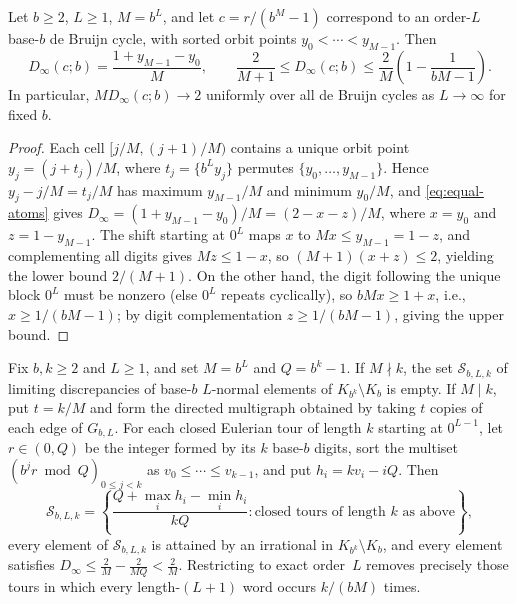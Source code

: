 \documentclass[11pt]{article}
\newcommand{\fr}[1]{\{#1\}}
\begin{document}
\begin{proposition}\label{prop:deBruijn-envelope}
Let $b\ge2$, $L\ge1$, $M=b^L$, and let $c=r/(b^M-1)$ correspond to an order-$L$ base-$b$ de Bruijn cycle, with sorted orbit points $y_0<\cdots<y_{M-1}$. Then
\begin{equation}\label{eq:deBruijn-envelope}
D_\infty(c;b)=\frac{1+y_{M-1}-y_0}{M},\qquad
\frac2{M+1}\le D_\infty(c;b)\le\frac2M\left(1-\frac1{bM-1}\right).
\end{equation}
In particular, $M D_\infty(c;b)\to2$ uniformly over all de Bruijn cycles as $L\to\infty$ for fixed $b$.
\end{proposition}

\begin{proof}
Each cell $[j/M,(j+1)/M)$ contains a unique orbit point $y_j=(j+t_j)/M$, where $t_j=\fr{b^L y_j}$ permutes $\{y_0,\dots,y_{M-1}\}$. Hence $y_j-j/M=t_j/M$ has maximum $y_{M-1}/M$ and minimum $y_0/M$, and \eqref{eq:equal-atoms} gives $D_\infty=(1+y_{M-1}-y_0)/M=(2-x-z)/M$, where $x=y_0$ and $z=1-y_{M-1}$. The shift starting at $0^L$ maps $x$ to $Mx\le y_{M-1}=1-z$, and complementing all digits gives $Mz\le 1-x$, so $(M+1)(x+z)\le2$, yielding the lower bound $2/(M+1)$. On the other hand, the digit following the unique block $0^L$ must be nonzero (else $0^L$ repeats cyclically), so $bMx\ge 1+x$, i.e., $x\ge 1/(bM-1)$; by digit complementation $z\ge 1/(bM-1)$, giving the upper bound.
\end{proof}

\begin{proposition}\label{prop:finite-spectrum}
Fix $b,k\ge2$ and $L\ge1$, and set $M=b^L$ and $Q=b^k-1$. If $M\nmid k$, the set $\mathcal S_{b,L,k}$ of limiting discrepancies of base-$b$ $L$-normal elements of $K_{b^k}\setminus K_b$ is empty. If $M\mid k$, put $t=k/M$ and form the directed multigraph obtained by taking $t$ copies of each edge of $G_{b,L}$. For each closed Eulerian tour of length $k$ starting at $0^{L-1}$, let $r\in(0,Q)$ be the integer formed by its $k$ base-$b$ digits, sort the multiset $(b^jr\bmod Q)_{0\le j<k}$ as $v_0\le\cdots\le v_{k-1}$, and put $h_i=kv_i-iQ$. Then
\begin{equation}\label{eq:finite-spectrum}
\mathcal S_{b,L,k}=\left\{\frac{Q+\max_i h_i-\min_i h_i}{kQ}:\text{closed tours of length }k\text{ as above}\right\},
\end{equation}
every element of $\mathcal S_{b,L,k}$ is attained by an irrational in $K_{b^k}\setminus K_b$, and every element satisfies $D_\infty\le\frac2M-\frac2{MQ}<\frac2M$. Restricting to exact order~$L$ removes precisely those tours in which every length-$(L+1)$ word occurs $k/(bM)$ times.
\end{proposition}
\end{document}
